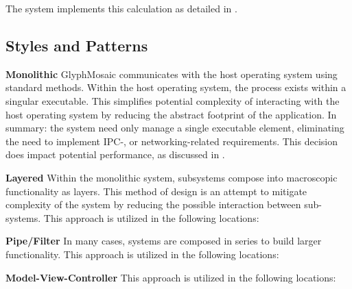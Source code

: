 \begin{itemize}
{{\begin{itemize}
{          The system implements this calculation as detailed in .
        }
      \end{itemize}
    }
  }
\end{itemize}


\subsection{Styles and Patterns}
\textbf{Monolithic}
GlyphMosaic communicates with the host operating system using standard methods.
Within the host operating system, the process exists within a singular executable.
This simplifies potential complexity of interacting with the host operating system by reducing the abstract footprint of the application.
In summary: the system need only manage a single executable element, eliminating the need to implement IPC-, or networking-related requirements.
This decision does impact potential performance, as discussed in .


\textbf{Layered}
Within the monolithic system, subsystems compose into macroscopic functionality as layers.
This method of design is an attempt to mitigate complexity of the system by reducing the possible interaction between sub-systems.
This approach is utilized in the following locations:
\begin{itemize}
\end{itemize}


\textbf{Pipe/Filter}
In many cases, systems are composed in series to build larger functionality.
This approach is utilized in the following locations:
\begin{itemize}
\end{itemize}


\textbf{Model-View-Controller}
This approach is utilized in the following locations:
\begin{itemize}
\end{itemize}



